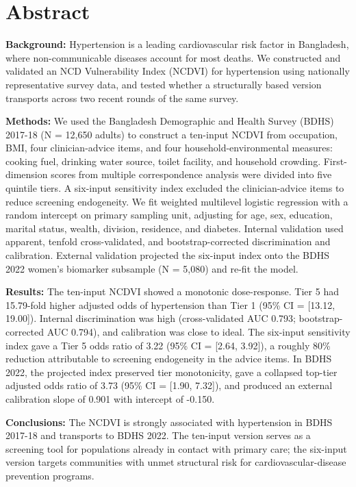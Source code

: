 \documentclass[
  12pt,
  a4paper]{article}
\author{}
\date{\vspace{-2.5em}}
\begin{document}


\newpage
{}

\section*{Abstract}\label{abstract}

\textbf{Background:} Hypertension is a leading cardiovascular risk factor in Bangladesh, where non-communicable diseases account for most deaths. We constructed and validated an NCD Vulnerability Index (NCDVI) for hypertension using nationally representative survey data, and tested whether a structurally based version transports across two recent rounds of the same survey.

\textbf{Methods:} We used the Bangladesh Demographic and Health Survey (BDHS) 2017-18 (N = 12,650 adults) to construct a ten-input NCDVI from occupation, BMI, four clinician-advice items, and four household-environmental measures: cooking fuel, drinking water source, toilet facility, and household crowding. First-dimension scores from multiple correspondence analysis were divided into five quintile tiers. A six-input sensitivity index excluded the clinician-advice items to reduce screening endogeneity. We fit weighted multilevel logistic regression with a random intercept on primary sampling unit, adjusting for age, sex, education, marital status, wealth, division, residence, and diabetes. Internal validation used apparent, tenfold cross-validated, and bootstrap-corrected discrimination and calibration. External validation projected the six-input index onto the BDHS 2022 women's biomarker subsample (N = 5,080) and re-fit the model.

\textbf{Results:} The ten-input NCDVI showed a monotonic dose-response. Tier 5 had 15.79-fold higher adjusted odds of hypertension than Tier 1 (95\% CI = {[}13.12, 19.00{]}). Internal discrimination was high (cross-validated AUC 0.793; bootstrap-corrected AUC 0.794), and calibration was close to ideal. The six-input sensitivity index gave a Tier 5 odds ratio of 3.22 (95\% CI = {[}2.64, 3.92{]}), a roughly 80\% reduction attributable to screening endogeneity in the advice items. In BDHS 2022, the projected index preserved tier monotonicity, gave a collapsed top-tier adjusted odds ratio of 3.73 (95\% CI = {[}1.90, 7.32{]}), and produced an external calibration slope of 0.901 with intercept of -0.150.

\textbf{Conclusions:} The NCDVI is strongly associated with hypertension in BDHS 2017-18 and transports to BDHS 2022. The ten-input version serves as a screening tool for populations already in contact with primary care; the six-input version targets communities with unmet structural risk for cardiovascular-disease prevention programs.
\end{document}
